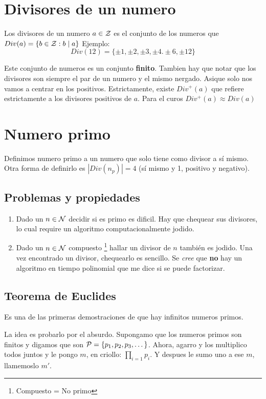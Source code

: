 \documentclass[12pt,a4paper]{report}
\begin{document}
\section{Divisores de un numero}
Los divisores de un numero $a \in \mathcal{{Z}}$ es el conjunto de los numeros que $Div(a) = \{ b \in \mathcal{{Z}} : b \mid a \}$
Ejemplo:
$$
Div(12) = \{ \pm 1, \pm 2, \pm 3, \pm 4. \pm 6, \pm12 \}
$$

Este conjunto de numeros es un conjunto \textbf{finito}. Tambien hay que notar que los divisores son siempre el par de un numero y el mismo nergado. Asique solo nos vamos a centrar en los positivos.
Estrictamente, existe $Div^+(a)$ que refiere estrictamente a los divisores positivos de $a$. Para el curos $Div^+(a) \approx Div(a)$

\section{Numero primo}
Definimos numero primo a un numero que solo tiene como divisor a sí mismo. Otra forma de definirlo es $| Div(n_p) | = 4$ (sí mismo y 1, positivo y negativo).

\subsection{Problemas y propiedades}
\begin{enumerate}
  \item{Dado un $n \in \mathcal{{N}}$ decidir si es primo es dificil. Hay que chequear sus divisores, lo cual require un algoritmo computacionalmente jodido.}
  \item{Dado un $n \in \mathcal{{N}}$ compuesto \footnote{Compuesto = No primo} hallar un divisor de $n$ también es jodido. Una vez encontrado un divisor, chequearlo es sencillo. Se \textit{cree} que \textbf{no} hay un algoritmo en tiempo polinomial que me dice si se puede factorizar.}
\end{enumerate}


\subsection{Teorema de Euclides}
Es una de las primeras demostraciones de que hay infinitos numeros primos.

La idea es probarlo por el absurdo. Supongamo que los numeros primos son finitos y digamos que son $\mathcal{{P}} = \{ p_1, p_2, p_3, \dots \}$. Ahora, agarro y los multiplico todos juntos y le pongo $m$, en criollo: $\prod_{i = 1} p_i$. Y despues le sumo uno a ese $m$, llamemoslo $m'$.
\end{document}
